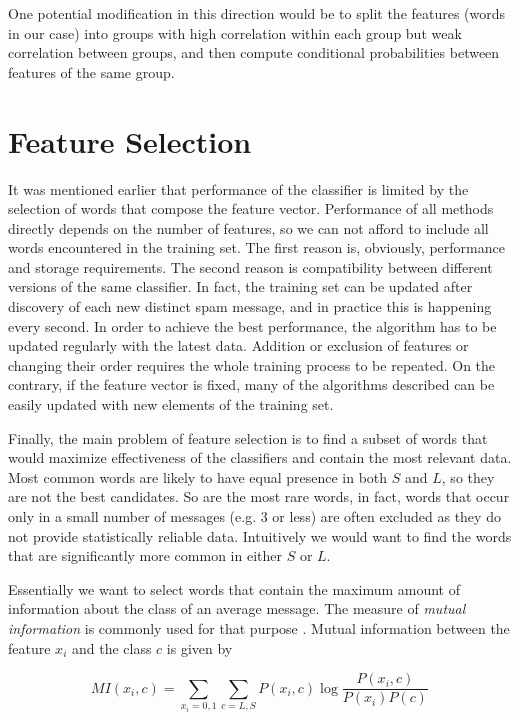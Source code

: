 \documentclass[12pt]{report}
\begin{document}
One potential modification in this direction would be to split the features (words in our case) into groups with high correlation within each group but weak correlation between groups, and then compute conditional probabilities between features of the same group.

\newpage


\chapter{Feature Selection}

It was mentioned earlier that performance of the classifier is limited by the selection of words that compose the feature vector. Performance of all methods directly depends on the number of features, so we can not afford to include all words encountered in the training set. The first reason is, obviously, performance and storage requirements. The second reason is compatibility between different versions of the same classifier. In fact, the training set can be updated after discovery of each new distinct spam message, and in practice this is happening every second. In order to achieve the best performance, the algorithm has to be updated regularly with the latest data. Addition or exclusion of features or changing their order requires the whole training process to be repeated. On the contrary, if the feature vector is fixed, many of the algorithms described can be easily updated with new elements of the training set.

Finally, the main problem of feature selection is to find a subset of words that would maximize effectiveness of the classifiers and contain the most relevant data. Most common words are likely to have equal presence in both $S$ and $L$, so they are not the best candidates. So are the most rare words, in fact, words that occur only in a small number of messages (e.g. 3 or less) are often excluded as they do not provide statistically reliable data. Intuitively we would want to find the words that are significantly more common in either $S$ or $L$.

Essentially we want to select words that contain the maximum amount of information about the class of an average message. The measure of \textit{mutual information} is commonly used for that purpose \cite{Sahami}. Mutual information between the feature $x_i$ and the class $c$ is given by

$$MI(x_i, c) = \sum_{x_i=0,1} \sum_{c=L,S} P(x_i, c) \log \frac{P(x_i, c)}{P(x_i) P(c)}$$
\end{document}
